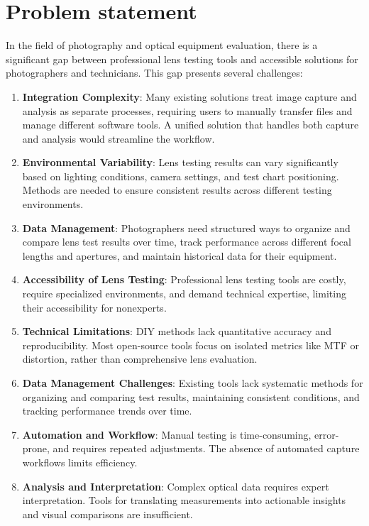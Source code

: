 \section*{Problem statement}
In the field of photography and optical equipment evaluation, there is a significant gap between professional lens testing tools and accessible solutions for photographers and technicians. This gap presents several challenges:

\begin{enumerate}
    \item \textbf{Integration Complexity}: Many existing solutions treat image capture and analysis as separate processes, requiring users to manually transfer files and manage different software tools. A unified solution that handles both capture and analysis would streamline the workflow.
    
    \item \textbf{Environmental Variability}: Lens testing results can vary significantly based on lighting conditions, camera settings, and test chart positioning. Methods are needed to ensure consistent results across different testing environments.
    
    \item \textbf{Data Management}: Photographers need structured ways to organize and compare lens test results over time, track performance across different focal lengths and apertures, and maintain historical data for their equipment.

    \item \textbf{Accessibility of Lens Testing}: Professional lens testing tools are costly, require specialized environments, and demand technical expertise, limiting their accessibility for nonexperts.
        
    \item \textbf{Technical Limitations}: DIY methods lack quantitative accuracy and reproducibility. Most open-source tools focus on isolated metrics like MTF or distortion, rather than comprehensive lens evaluation.
        
    \item \textbf{Data Management Challenges}: Existing tools lack systematic methods for organizing and comparing test results, maintaining consistent conditions, and tracking performance trends over time.

    \item \textbf{Automation and Workflow}: Manual testing is time-consuming, error-prone, and requires repeated adjustments. The absence of automated capture workflows limits efficiency.

    \item \textbf{Analysis and Interpretation}: Complex optical data requires expert interpretation. Tools for translating measurements into actionable insights and visual comparisons are insufficient.
\end{enumerate}

